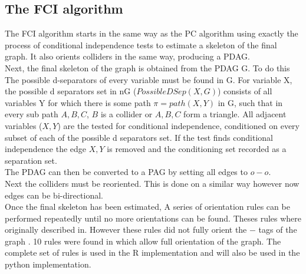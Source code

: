 \documentclass{article}
\begin{document}
\subsection{The FCI algorithm}

The FCI algorithm starts in the same way as the PC algorithm using exactly the process of conditional independence tests to estimate a skeleton of the final graph. It also orients colliders in the same way, producing a PDAG.
\\

Next, the final skeleton of the graph is obtained from the PDAG G. To do this The possible d-separators of every variable must be found in G. For variable X, the possible d separators set in nG ($PossibleDSep(X,G)$) consists of all variables Y for which there is some path $\pi = path(X,Y)$ in G, such that in every sub path $A,B,C$, $B$ is a collider or $A,B,C$ form a triangle. All adjacent variables ($X,Y$) are the tested for conditional independence, conditioned on every subset of each of the possible d separators set. If the test finds conditional independence the edge $X,Y$ is removed and the conditioning set recorded as a separation set. 
\\

The PDAG can then be converted to a PAG by setting all edges to $o-o$.\\

Next the colliders must be reoriented. This is done on a similar way however now edges can be bi-directional.\\

Once the final skeleton has been estimated, A series of orientation rules can be performed repeatedly until no more orientations can be found. Theses rules where originally described in. However these rules did not fully orient the $-$ tags of the graph \cite{ZHANG20081873}. 10 rules were found in \cite{ZHANG20081873} which allow full orientation of the graph. The complete set of rules is used in the R implementation and will also be used in the python implementation.\\
\end{document}

